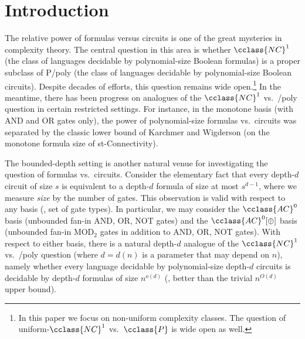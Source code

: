 \documentclass{toc}
\newcommand{\AC}{\cclass{AC}}
\newcommand{\NC}{\cclass{NC}}
\begin{document}
%
%
%




\section{Introduction}

The relative power of formulas versus circuits is one of the great mysteries in complexity \mbox{theory}. The central question in this area is whether $\NC^1$ (the class of languages decidable by polynomial-size Boolean formulas) is a proper subclass of P/poly (the class of languages decidable by polynomial-size Boolean circuits). Despite decades of efforts, this question remains wide open.\footnote{In this paper we focus on non-uniform complexity classes. The question of uniform-$\NC^1$ vs.\ $\cclass{P}$ is wide open as well.}
In the meantime, there has been progress on analogues of the $\NC^1$ vs.\ /poly question in certain restricted settings. For instance, in the monotone basis (with AND and OR gates only), the power of polynomial-size formulas vs.\ circuits was separated by the classic lower bound of Karchmer and Wigderson \cite{karchmer1990monotone} (on the monotone formula size of st-Connectivity).

The bounded-depth setting is another natural venue for investigating
the question of %
formulas  %
vs.\ circuits. Consider the elementary fact that every depth-$d$ circuit of size $s$ is equivalent to a depth-$d$ formula of size at most $s^{d-1}$, where we measure \emph{size} by the number of gates. This observation is valid with respect to any basis (\ie, set of gate types). In particular, we may consider the $\AC^0$ basis (unbounded fan-in AND, OR, NOT gates) and the $\AC^0[\oplus]$ basis (unbounded fan-in MOD$_2$ gates in addition to AND, OR, NOT gates). With respect to either basis, there is a natural depth-$d$ analogue of the $\NC^1$ vs.\ /poly question (where $d = d(n)$ is a parameter that may depend on $n$), namely whether every language decidable by polynomial-size depth-$d$ circuits is decidable by depth-$d$ formulas of size $n^{o(d)}$ (\ie, better than the trivial $n^{O(d)}$ upper bound).
\end{document}
